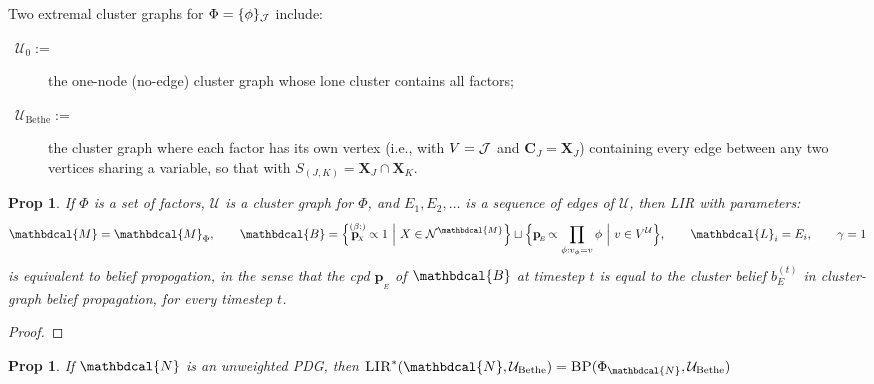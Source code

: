\documentclass{article}
\theoremstyle{plain}
\newtheorem{prop}[theorem]{Prop}
\theoremstyle{definition}
\theoremstyle{remark}
\newcommand\mat[1]{\mathbf{#1}}
\newcommand{\bp}[1][L]{\mat{p}_{\!_{#1}\!}}
\newcommand{\N}{\mathcal N}
\newcommand{\dg}[1]{\mathbdcal{#1}}
\newcommand{\bundle}{\mathbin{\sqcup}}
\newcommand{\PDGof}[1]{{\dg M}_{#1}}
\newcommand{\FGof}[1]{\Phi_{{#1}}}
\begin{document}
Two extremal cluster graphs for $\Phi = \{\phi\}_{\cal J}$ include:
\begin{description}
	\item[{~$\mathcal U_0 :=$}] the one-node (no-edge) cluster graph  whose lone cluster contains all factors;
	\item[{~$\mathcal U_{\mathrm{Bethe}} :=$~}] the cluster graph where each factor has its own vertex (i.e., with $V = \cal J$ and $\mat C_J = \mat X_J$) containing every edge between any two vertices sharing a variable, so that with $S_{(J,K)} = \mat X_J \cap \mat X_K$.
\end{description}


\begin{defn}
\end{defn}

\clearpage
\begin{prop}
	If $\Phi$ is a set of factors, $\mathcal U$ is a cluster graph for $\Phi$, and $E_1, E_2, \ldots$ is a sequence of edges of $\mathcal U$, then LIR with parameters:
	\begin{equation*}
		\dg M = \PDGof{\Phi},
		\qquad \dg B = \Big\{ \overset{(\beta :  )}{\bp[X]} \propto 1 ~\Big|~ X \in \N^{\dg M} \Big\} \bundle
			\Big\{ \bp[E] \propto \prod_{\phi : v_\phi = v} \phi  ~\Big|~ v \in V^{\mathcal U} \Big\},
		\qquad \dg L_i = E_i,
		\qquad \gamma = 1
	\end{equation*}
	is equivalent to belief propogation, in the sense that the cpd $\bp[E]$ of $\dg B$ at timestep $t$ is equal to the cluster belief $b^{(t)}_{E}$ in cluster-graph belief propagation, for every timestep $t$.
\end{prop}
\begin{proof}

\end{proof}


\begin{prop}
	If $\dg N$ is an unweighted PDG, then
	$
		\textsc{LIR}^*(\dg N, \mathcal U_{\mathrm{Bethe}})
			 = \textsc{BP}( \FGof{\dg N}, \mathcal U_{\mathrm{Bethe}} )
	$
\end{prop}
\end{document}
